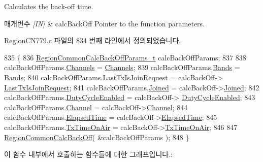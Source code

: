 Calculates the back-\/off time. 


\begin{DoxyParams}{매개변수}
{\em \mbox{[}\+I\+N\mbox{]}} & calc\+Back\+Off Pointer to the function parameters. \\
\hline
\end{DoxyParams}


Region\+C\+N779.\+c 파일의 834 번째 라인에서 정의되었습니다.


\begin{DoxyCode}
835 \{
836     \mbox{\hyperlink{structs_region_common_calc_back_off_params}{RegionCommonCalcBackOffParams\_t}} calcBackOffParams;
837 
838     calcBackOffParams.\mbox{\hyperlink{structs_region_common_calc_back_off_params_afecbd1e457cbd79eb7072bd140ff33d4}{Channels}} = \mbox{\hyperlink{_region_c_n779_8c_ad43b16563c3a87159ec34d1db860a3da}{Channels}};
839     calcBackOffParams.\mbox{\hyperlink{structs_region_common_calc_back_off_params_a18afce97f43b46e9d294e5babbb15f15}{Bands}} = \mbox{\hyperlink{_region_c_n779_8c_af0fa082231b29a5cac086386277e6ecc}{Bands}};
840     calcBackOffParams.\mbox{\hyperlink{structs_region_common_calc_back_off_params_a4088d0ca2ff21fd5cdc110e14816dd53}{LastTxIsJoinRequest}} = calcBackOff->
      \mbox{\hyperlink{structs_calc_back_off_params_a4088d0ca2ff21fd5cdc110e14816dd53}{LastTxIsJoinRequest}};
841     calcBackOffParams.\mbox{\hyperlink{structs_region_common_calc_back_off_params_ac2f6caa0f3b02d2ac5056c3ee7c22652}{Joined}} = calcBackOff->\mbox{\hyperlink{structs_calc_back_off_params_ac2f6caa0f3b02d2ac5056c3ee7c22652}{Joined}};
842     calcBackOffParams.\mbox{\hyperlink{structs_region_common_calc_back_off_params_a4d755868e0e80089462286c3ba6a6f18}{DutyCycleEnabled}} = calcBackOff->
      \mbox{\hyperlink{structs_calc_back_off_params_a4d755868e0e80089462286c3ba6a6f18}{DutyCycleEnabled}};
843     calcBackOffParams.\mbox{\hyperlink{structs_region_common_calc_back_off_params_a1ca6f01ca18afe402de51babe8c95f5e}{Channel}} = calcBackOff->\mbox{\hyperlink{structs_calc_back_off_params_a1ca6f01ca18afe402de51babe8c95f5e}{Channel}};
844     calcBackOffParams.\mbox{\hyperlink{structs_region_common_calc_back_off_params_a2ece30988e7a5bac284623173173c71a}{ElapsedTime}} = calcBackOff->\mbox{\hyperlink{structs_calc_back_off_params_a2ece30988e7a5bac284623173173c71a}{ElapsedTime}};
845     calcBackOffParams.\mbox{\hyperlink{structs_region_common_calc_back_off_params_aa17a8607485db100d315e74853dd217e}{TxTimeOnAir}} = calcBackOff->\mbox{\hyperlink{structs_calc_back_off_params_aa17a8607485db100d315e74853dd217e}{TxTimeOnAir}};
846 
847     \mbox{\hyperlink{group___r_e_g_i_o_n_c_o_m_m_o_n_gae2b1dfba27c79f605048f2d9869dc57d}{RegionCommonCalcBackOff}}( &calcBackOffParams );
848 \}
\end{DoxyCode}
이 함수 내부에서 호출하는 함수들에 대한 그래프입니다.\+:
\mbox{\label{group___r_e_g_i_o_n_c_n779_ga06c5fe5ebbc02741394fb573944467b7}} 
